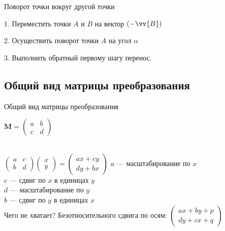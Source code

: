 \documentclass[10pt]{beamer}
\begin{document}
\begin{frame}{Поворот точки вокруг другой точки}
{    		\pause
    		
    		1. Переместить точки $A$ и $B$ на вектор $(-\vv{B})$
    		
    		\pause
    		
    		2. Осуществить поворот точки $A$ на угол $\alpha$
    		
    		\pause
    		
    		3. Выполнить обратный первому шагу перенос.
    	}
    	
    \end{frame}
    
    \subsection{Общий вид матрицы преобразования}
    
    \begin{frame}{Общий вид матрицы преобразования}
    	
    	{
    		\centering
    		
    		$   \textbf{M}=
    			\begin{pmatrix}
    				a&b\\
    				c&d
    			\end{pmatrix}
    		$ \\ ~ \\
    	}
    	
    	{
    		 $
    		\begin{pmatrix}
    			a&c\\
    			b&d
    		\end{pmatrix}
    		\begin{pmatrix}
    			x\\
    			y
    		\end{pmatrix}
    		=
    		\begin{pmatrix}
    			ax+cy \\
    			dy+bx
    		\end{pmatrix}
    		$
    	}
    	{
    		$a$ --- масштабирование по $x$ \\
    		$c$ --- сдвиг по $x$ в единицах $y$\\
    		$d$ --- масштабирование по $y$\\
    		$b$ --- сдвиг по $y$ в единицах $x$
    	} 
    	\hfil \\[2em]
    	
    	Чего не хватает? Безотносительного сдвига по осям:     		
    	$
    	\begin{pmatrix}
    		ax+by+p \\
    		dy+cx+q
    	\end{pmatrix}
    	$    	
    	
    	
    \end{frame}
    
\end{document}
